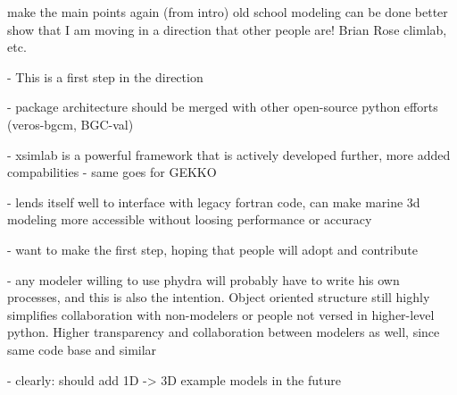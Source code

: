 \documentclass[journal abbreviations, manuscript]{copernicus}
\begin{document}
\clearpage



\conclusions  %
make the main points again (from intro)
old school modeling can be done better
show that I am moving in a direction that other people are! Brian Rose climlab, etc.

- This is a first step in the direction

- package architecture should be merged with other open-source python efforts (veros-bgcm, BGC-val)

- xsimlab is a powerful framework that is actively developed further, more added compabilities
- same goes for GEKKO

- lends itself well to interface with legacy fortran code, can make marine 3d modeling more accessible without loosing performance or accuracy

- want to make the first step, hoping that people will adopt and contribute

- any modeler willing to use phydra will probably have to write his own processes, and this is also the intention. Object oriented structure still highly simplifies collaboration with non-modelers or people not versed in higher-level python. Higher transparency and collaboration between modelers as well, since same code base and similar 

- clearly: should add 1D -> 3D example models in the future














\end{document}
